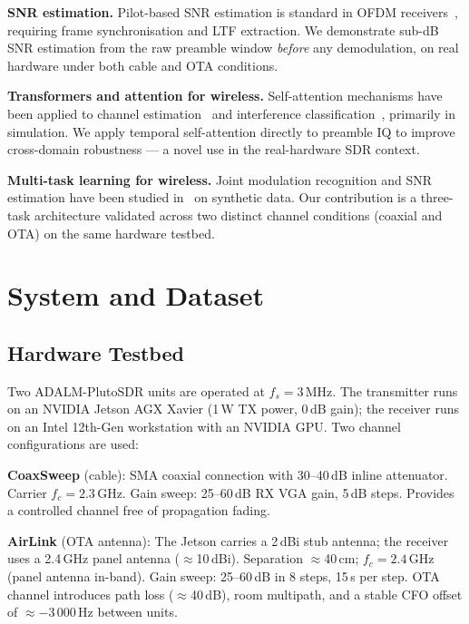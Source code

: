 \documentclass[conference]{IEEEtran}
\begin{document}
\textbf{SNR estimation.}
Pilot-based SNR estimation is standard in OFDM
receivers~\cite{ye2018power}, requiring frame synchronisation and LTF
extraction.
We demonstrate sub-dB SNR estimation from the raw preamble window
\emph{before} any demodulation, on real hardware under both cable
and OTA conditions.

\textbf{Transformers and attention for wireless.}
Self-attention mechanisms have been applied to channel
estimation~\cite{yang2020ofdm} and interference
classification~\cite{zhang2021interference}, primarily in simulation.
We apply temporal self-attention directly to preamble IQ to improve
cross-domain robustness — a novel use in the real-hardware SDR context.

\textbf{Multi-task learning for wireless.}
Joint modulation recognition and SNR estimation have been studied
in~\cite{o2017introduction} on synthetic data.
Our contribution is a three-task architecture validated across
two distinct channel conditions (coaxial and OTA) on the same
hardware testbed.

\section{System and Dataset}
\label{sec:system}

\subsection{Hardware Testbed}
\label{sec:hw}

Two ADALM-PlutoSDR units are operated at $f_s = 3$\,MHz.
The transmitter runs on an NVIDIA Jetson AGX Xavier (1\,W TX power,
0\,dB gain); the receiver runs on an Intel 12th-Gen workstation with
an NVIDIA GPU.
Two channel configurations are used:

\textbf{CoaxSweep} (cable): SMA coaxial connection with 30–40\,dB
inline attenuator.
Carrier $f_c = 2.3$\,GHz.
Gain sweep: 25–60\,dB RX VGA gain, 5\,dB steps.
Provides a controlled channel free of propagation fading.

\textbf{AirLink} (OTA antenna): The Jetson carries a 2\,dBi stub
antenna; the receiver uses a 2.4\,GHz panel antenna ($\approx$10\,dBi).
Separation $\approx$40\,cm; $f_c = 2.4$\,GHz (panel antenna in-band).
Gain sweep: 25–60\,dB in 8 steps, 15\,s per step.
OTA channel introduces path loss ($\approx$40\,dB), room multipath,
and a stable CFO offset of $\approx -3\,000$\,Hz between units.
\end{document}
